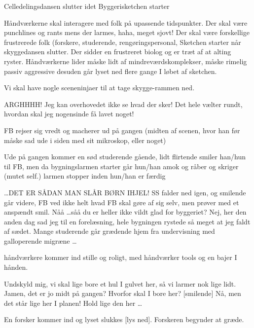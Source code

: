 \documentclass[a4paper,11pt]{article}
\begin{document}
\begin{sketch}

\scene Celledelingsdansen slutter idet Byggerisketchen starter

\scene Håndværkerne skal interagere med folk på upassende tidspunkter. Der skal være punchlines og rants mens der larmes, haha, meget sjovt!
Der skal være forskellige frustrerede folk (forskere, studerende, rengøringspersonal,
Sketchen starter når skyggedansen slutter. Der sidder en frustreret biolog og er træt af at alting ryster. Håndværkerne lider måske lidt af mindreværdskomplekser, måske rimelig passiv aggressive desuden går lyset ned flere gange I løbet af sketchen.  

\scene Vi skal have nogle sceneninjaer til at tage skygge-rammen ned. 

 ARGHHHH!  Jeg kan overhovedet ikke se hvad der sker! Det hele vælter rundt, hvordan skal jeg nogensinde få lavet noget!

\scene FB rejser sig vredt og macherer ud på gangen (midten af scenen, hvor han før måske sad ude i siden med sit mikroskop, eller noget)

\scene Ude på gangen kommer en sød studerende gående, lidt flirtende smiler han/hun til FB, men da bygningslarmen starter går hun/han amok og råber og skriger (mutet self.) larmen stopper inden hun/han er færdig

 \ldots DET ER SÅDAN MAN SLÅR BØRN IHJEL!
SS falder ned igen, og smilende går videre, FB ved ikke helt hvad FB skal gøre af sig selv, men prøver med et anspændt smil.
 Nåå \ldots såå du er heller ikke vildt glad for byggeriet?
 Nej, her den anden dag sad jeg til en forelæsning, hele bygningen rystede så meget at jeg faldt af sædet. Mange studerende går grædende hjem fra undervisning med galloperende migræne \ldots

 håndværkere kommer ind stille og roligt, med håndværker tools og en bajer I hånden.

 Undskyld mig, vi skal lige bore et hul I gulvet her, så vi larmer nok lige lidt.
 Jamen, det er jo midt på gangen? Hvorfor skal I bore her?
[smilende] Nå, men det står lige her I planen! 
 Hold lige den her \ldots {}

\scene En forsker kommer ind og lyset slukkes [lys ned]. Forskeren begynder at græde.


\end{sketch}
\end{document}
